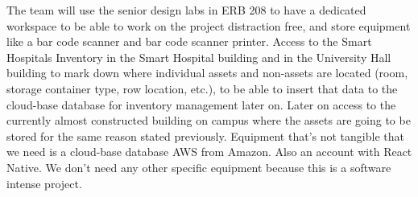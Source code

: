 The team will use the senior design labs in ERB 208 to have a dedicated workspace to be able to work on the project distraction free, and store equipment like a bar code scanner and bar code scanner printer. Access to the Smart Hospitals Inventory in the Smart Hospital building and in the University Hall building to mark down where individual assets and non-assets are located (room, storage container type, row location, etc.), to be able to insert that data to the cloud-base database for inventory management later on. Later on access to the currently almost constructed building on campus where the assets are going to be stored for the same reason stated previously. Equipment that's not tangible that we need is a cloud-base database AWS from Amazon. Also an account with React Native. We don't need any other specific equipment because this is a software intense project. 